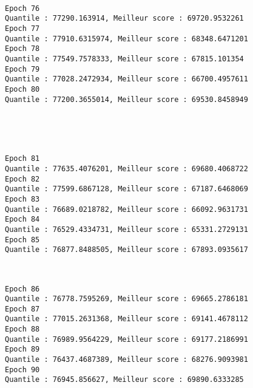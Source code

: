 \documentclass[11pt]{article}
\begin{document}
    \begin{center}
    \end{center}
    { \hspace*{\fill} \\}
    
    \begin{Verbatim}[commandchars=\\\{\}]
Epoch 76
Quantile : 77290.163914, Meilleur score : 69720.9532261
Epoch 77
Quantile : 77910.6315974, Meilleur score : 68348.6471201
Epoch 78
Quantile : 77549.7578333, Meilleur score : 67815.101354
Epoch 79
Quantile : 77028.2472934, Meilleur score : 66700.4957611
Epoch 80
Quantile : 77200.3655014, Meilleur score : 69530.8458949

    \end{Verbatim}

    \begin{center}
    \end{center}
    { \hspace*{\fill} \\}
    
    \begin{center}
    \end{center}
    { \hspace*{\fill} \\}
    
    \begin{Verbatim}[commandchars=\\\{\}]
Epoch 81
Quantile : 77635.4076201, Meilleur score : 69680.4068722
Epoch 82
Quantile : 77599.6867128, Meilleur score : 67187.6468069
Epoch 83
Quantile : 76689.0218782, Meilleur score : 66092.9631731
Epoch 84
Quantile : 76529.4334731, Meilleur score : 65331.2729131
Epoch 85
Quantile : 76877.8488505, Meilleur score : 67893.0935617

    \end{Verbatim}

    \begin{center}
    \end{center}
    { \hspace*{\fill} \\}
    
    \begin{Verbatim}[commandchars=\\\{\}]
Epoch 86
Quantile : 76778.7595269, Meilleur score : 69665.2786181
Epoch 87
Quantile : 77015.2631368, Meilleur score : 69141.4678112
Epoch 88
Quantile : 76989.9564229, Meilleur score : 69177.2186991
Epoch 89
Quantile : 76437.4687389, Meilleur score : 68276.9093981
Epoch 90
Quantile : 76945.856627, Meilleur score : 69890.6333285

    \end{Verbatim}
\end{document}
